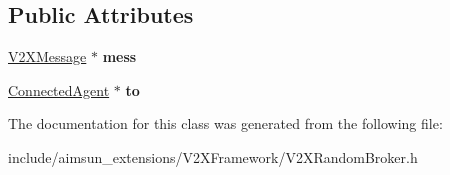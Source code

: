 \subsection*{Public Attributes}
\begin{DoxyCompactItemize}
\item 
\hyperlink{classV2XMessage}{V2\+X\+Message} $\ast$ {\bfseries mess}\hypertarget{classV2XRandomBroker_1_1PendingMessage_ac4b5ef2b8dc77c9fbed5899c7d80f26c}{}\label{classV2XRandomBroker_1_1PendingMessage_ac4b5ef2b8dc77c9fbed5899c7d80f26c}

\item 
\hyperlink{classConnectedAgent}{Connected\+Agent} $\ast$ {\bfseries to}\hypertarget{classV2XRandomBroker_1_1PendingMessage_adf917811a1753d41a80276d6923df750}{}\label{classV2XRandomBroker_1_1PendingMessage_adf917811a1753d41a80276d6923df750}

\end{DoxyCompactItemize}


The documentation for this class was generated from the following file\+:\begin{DoxyCompactItemize}
\item 
include/aimsun\+\_\+extensions/\+V2\+X\+Framework/V2\+X\+Random\+Broker.\+h\end{DoxyCompactItemize}
